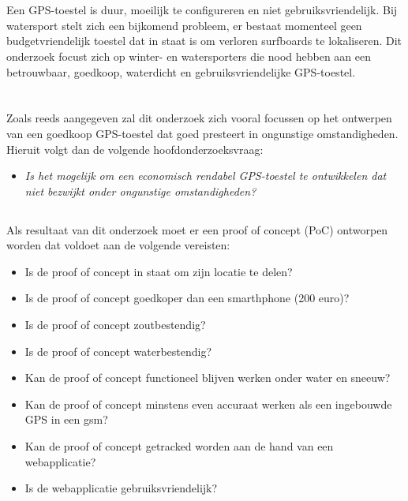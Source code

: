 \section{}
\label{sec:probleemstelling}

 Een GPS-toestel is duur, moeilijk te configureren en niet gebruiksvriendelijk. Bij watersport stelt zich een bijkomend probleem, er bestaat momenteel geen budgetvriendelijk toestel dat in staat is om verloren surfboards te lokaliseren. Dit onderzoek focust zich op winter- en watersporters die nood hebben aan een betrouwbaar, goedkoop, waterdicht en gebruiksvriendelijke GPS-toestel.

\section{}
\subsection{}
\label{sec:onderzoeksvraag}

Zoals reeds aangegeven zal dit onderzoek zich vooral focussen op het ontwerpen van een goedkoop GPS-toestel dat goed presteert in ongunstige omstandigheden. Hieruit volgt dan de volgende hoofdonderzoeksvraag:
\newline
\begin{itemize}
	\item[] \textit{Is het mogelijk om een economisch rendabel GPS-toestel te ontwikkelen dat niet bezwijkt onder ongunstige omstandigheden?}
\end{itemize}

\subsection{}
Als resultaat van dit onderzoek moet er een proof of concept (PoC) ontworpen worden dat voldoet aan de volgende vereisten:
\begin{itemize}
	\item Is de proof of concept in staat om zijn locatie te delen?
	\item Is de proof of concept goedkoper dan een smarthphone (200 euro)?
	\item Is de proof of concept zoutbestendig?
	\item  Is de proof of concept waterbestendig?
    \item Kan de proof of concept functioneel blijven werken  onder water en sneeuw?
	\item Kan de proof of concept minstens even accuraat werken als een ingebouwde GPS in een gsm?
	\item Kan de proof of concept getracked worden aan de hand van een webapplicatie?
	\item Is de webapplicatie gebruiksvriendelijk?
\end{itemize}

